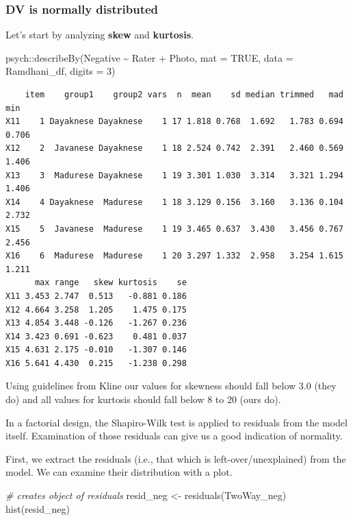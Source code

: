 \documentclass[
  11pt,
]{book}
\newenvironment{Shaded}{\begin{snugshade}}{\end{snugshade}}
\newcommand{\AttributeTok}[1]{\textcolor[rgb]{0.77,0.63,0.00}{#1}}
\newcommand{\CommentTok}[1]{\textcolor[rgb]{0.56,0.35,0.01}{\textit{#1}}}
\newcommand{\ConstantTok}[1]{\textcolor[rgb]{0.00,0.00,0.00}{#1}}
\newcommand{\DecValTok}[1]{\textcolor[rgb]{0.00,0.00,0.81}{#1}}
\newcommand{\FunctionTok}[1]{\textcolor[rgb]{0.00,0.00,0.00}{#1}}
\newcommand{\NormalTok}[1]{#1}
\newcommand{\OtherTok}[1]{\textcolor[rgb]{0.56,0.35,0.01}{#1}}
\newcommand{\SpecialCharTok}[1]{\textcolor[rgb]{0.00,0.00,0.00}{#1}}
\begin{document}
\hypertarget{dv-is-normally-distributed}{%
\subsubsection{DV is normally distributed}\label{dv-is-normally-distributed}}

Let's start by analyzing \textbf{skew} and \textbf{kurtosis}.

\begin{Shaded}
\begin{Highlighting}[]
\NormalTok{psych}\SpecialCharTok{::}\FunctionTok{describeBy}\NormalTok{(Negative }\SpecialCharTok{\textasciitilde{}}\NormalTok{ Rater }\SpecialCharTok{+}\NormalTok{ Photo, }\AttributeTok{mat =} \ConstantTok{TRUE}\NormalTok{, }\AttributeTok{data =}\NormalTok{ Ramdhani\_df,}
    \AttributeTok{digits =} \DecValTok{3}\NormalTok{)}
\end{Highlighting}
\end{Shaded}

\begin{verbatim}
    item    group1    group2 vars  n  mean    sd median trimmed   mad   min
X11    1 Dayaknese Dayaknese    1 17 1.818 0.768  1.692   1.783 0.694 0.706
X12    2  Javanese Dayaknese    1 18 2.524 0.742  2.391   2.460 0.569 1.406
X13    3  Madurese Dayaknese    1 19 3.301 1.030  3.314   3.321 1.294 1.406
X14    4 Dayaknese  Madurese    1 18 3.129 0.156  3.160   3.136 0.104 2.732
X15    5  Javanese  Madurese    1 19 3.465 0.637  3.430   3.456 0.767 2.456
X16    6  Madurese  Madurese    1 20 3.297 1.332  2.958   3.254 1.615 1.211
      max range   skew kurtosis    se
X11 3.453 2.747  0.513   -0.881 0.186
X12 4.664 3.258  1.205    1.475 0.175
X13 4.854 3.448 -0.126   -1.267 0.236
X14 3.423 0.691 -0.623    0.481 0.037
X15 4.631 2.175 -0.010   -1.307 0.146
X16 5.641 4.430  0.215   -1.238 0.298
\end{verbatim}

Using guidelines from Kline \citeyearpar{kline_principles_2016} our values for skewness should fall below 3.0 (they do) and all values for kurtosis should fall below 8 to 20 (ours do).

In a factorial design, the Shapiro-Wilk test is applied to residuals from the model itself. Examination of those residuals can give us a good indication of normality.

First, we extract the residuals (i.e., that which is left-over/unexplained) from the model. We can examine their distribution with a plot.

\begin{Shaded}
\begin{Highlighting}[]
\CommentTok{\# creates object of residuals}
\NormalTok{resid\_neg }\OtherTok{\textless{}{-}} \FunctionTok{residuals}\NormalTok{(TwoWay\_neg)}
\FunctionTok{hist}\NormalTok{(resid\_neg)}
\end{Highlighting}
\end{Shaded}
\end{document}
